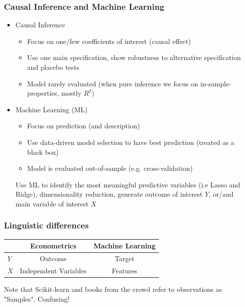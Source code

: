 \documentclass[compress, aspectratio=54]{beamer}
\begin{document}
\begin{frame}
\frametitle{Causal Inference and Machine Learning}
\begin{itemize}
\item Causal Inference
\begin{itemize}

\item Focus on one/few coefficients of interest (causal effect)
\item Use one main specification, show robustness to alternative specification and placebo tests
\item Model rarely evaluated (when pure inference we focus on in-sample-properties, mostly $R^2$)
\end{itemize}

\item Machine Learning (ML)
\begin{itemize}

\item Focus on prediction (and description)
\item  Use data-driven model selection to have best prediction (treated as a black box)
\item Model is evaluated out-of-sample (e.g. cross-validation)
\end{itemize}

Use ML to identify the most meaningful predictive variables (i.e Lasso and Ridge), dimensionality reduction, generate outcome of interest $Y$, or/and main variable of interest $X$
\end{itemize}
\end{frame}


\begin{frame}
\frametitle{Linguistic differences}

\begin{center}
\begin{tabular}{lcc}
  \hline
   &Econometrics&Machine Learning\\ \hline
$Y$ &  Outcome& Target  \\ 
$X$   &  Independent Variables  & Features \\ \hline
\end{tabular}
\end{center}
Note that Scikit-learn and books from the crowd refer to observations as "Samples".  Confusing!
\end{frame}
\end{document}
